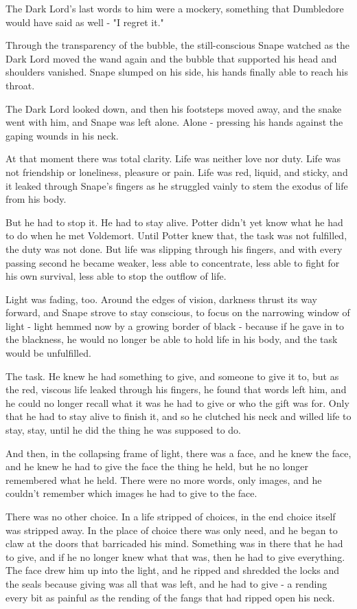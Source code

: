 The Dark Lord's last words to him were a mockery, something that Dumbledore would have said as well - "I regret it."

Through the transparency of the bubble, the still-conscious Snape watched as the Dark Lord moved the wand again and the bubble that supported his head and shoulders vanished. Snape slumped on his side, his hands finally able to reach his throat.

The Dark Lord looked down, and then his footsteps moved away, and the snake went with him, and Snape was left alone. Alone - pressing his hands against the gaping wounds in his neck.

At that moment there was total clarity. Life was neither love nor duty. Life was not friendship or loneliness, pleasure or pain. Life was red, liquid, and sticky, and it leaked through Snape's fingers as he struggled vainly to stem the exodus of life from his body.

But he had to stop it. He had to stay alive. Potter didn't yet know what he had to do when he met Voldemort. Until Potter knew that, the task was not fulfilled, the duty was not done. But life was slipping through his fingers, and with every passing second he became weaker, less able to concentrate, less able to fight for his own survival, less able to stop the outflow of life.

Light was fading, too. Around the edges of vision, darkness thrust its way forward, and Snape strove to stay conscious, to focus on the narrowing window of light - light hemmed now by a growing border of black - because if he gave in to the blackness, he would no longer be able to hold life in his body, and the task would be unfulfilled.

The task. He knew he had something to give, and someone to give it to, but as the red, viscous life leaked through his fingers, he found that words left him, and he could no longer recall what it was he had to give or who the gift was for. Only that he had to stay alive to finish it, and so he clutched his neck and willed life to stay, stay, until he did the thing he was supposed to do.

And then, in the collapsing frame of light, there was a face, and he knew the face, and he knew he had to give the face the thing he held, but he no longer remembered what he held. There were no more words, only images, and he couldn't remember which images he had to give to the face.

There was no other choice. In a life stripped of choices, in the end choice itself was stripped away. In the place of choice there was only need, and he began to claw at the doors that barricaded his mind. Something was in there that he had to give, and if he no longer knew what that was, then he had to give everything. The face drew him up into the light, and he ripped and shredded the locks and the seals because giving was all that was left, and he had to give - a rending every bit as painful as the rending of the fangs that had ripped open his neck.

